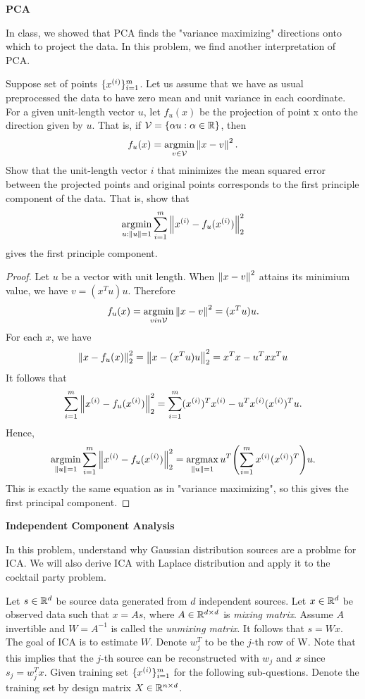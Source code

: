\documentclass[12pt,letterpaper,boxed]{hmcpset}
\DeclareMathOperator*{\argmax}{argmax}
\DeclareMathOperator*{\argmin}{argmin}
\newcommand{\summ}{\sum_{i=1}^m}
\begin{document}
\newpage
\begin{problem}[Problem 3]
  \textbf{PCA}

  In class, we showed that PCA finds the "variance maximizing" directions onto which to project the data. In this problem, we find another interpretation of PCA.

  Suppose set of points $\{ \xx\}_{i=1}^m$. Let us assume that we have as usual preprocessed the data to have zero mean and unit variance in each coordinate. For a given unit-length vector $u$, let $f_u(x)$ be the projection of point x onto the direction given by $u$. That is, if $\mathcal{V} = \{ \alpha u: \alpha \in \mathbb{R} \}$, then
  \[
  f_{u}(x) = \argmin_{v \in \mathcal{V}} \norm{x - v}^2.
  \]
  Show that the unit-length vector $i$ that minimizes the mean squared error between the projected points and original points corresponds to the first principle component of the data. That is, show that
  \[
  \argmin_{u: \norm{u} = 1} \sum_{i=1}^m \norm{\xx - f_u(\xx)}^2_2
  \]
  gives the first principle component.
\end{problem}

\begin{solution}
  \begin{proof}
    Let $u$ be a vector with unit length. When $\left\lVert x-v\right\rVert^2$ attains its minimium value, we have $v = (x^T u) u$. Therefore
    \[
    f_u(x) = \argmin_{v in \mathcal{V}} \norm{x - v}^2 = (x^T u) u.
    \]
    For each $x$, we have
    \[
    \begin{aligned}
      \left\lVert x - f_u(x)\right\rVert_2^2 = \left\lVert x - (x^T u) u\right\rVert_2^2 = x^T x - u^T x x^T u
    \end{aligned}
    \]
    It follows that
    \[
    \summ \norm{\xx - f_u(\xx)}_2^2 = \summ (\xx)^T \xx - u^T \xx (\xx)^T u.
    \]
    Hence,
    \[
    \argmin_{\norm{u} = 1} \summ \norm{\xx - f_u(\xx)}_2^2 = \argmax_{\norm{u} = 1} u^T \qty(\summ \xx (\xx)^T) u.
    \]
    This is exactly the same equation as in "variance maximizing", so this gives the first principal component.
  \end{proof}
\end{solution}

\newpage
\begin{problem}[Problem 4]
  \textbf{Independent Component Analysis}

  In this problem, understand why Gaussian distribution sources are a problme for ICA. We will also derive ICA with Laplace distribution and apply it to the cocktail party problem.

  Let $s \in \mathbb{R}^d$ be source data generated from $d$ independent sources. Let $x \in \mathbb{R}^d$ be observed data such that $x = As$, where $A \in \mathbb{R}^{d \times d}$ is \emph{mixing matrix}. Assume $A$ invertible and $W = A^{-1}$ is called the \emph{unmixing matrix}. It follows that $s = Wx$. The goal of ICA is to estimate $W$. Denote $w_j^T$ to be the $j$-th row of W. Note that this implies that the $j$-th source can be reconstructed with $w_j$ and $x$ since $s_j = w_j^T x$. Given training set $\{\xx\}_{i=1}^m$ for the following sub-questions. Denote the training set by design matrix $X \in \mathbb{R}^{n \times d}$.
\end{problem}
\end{document}

